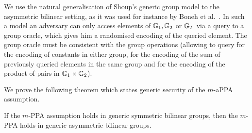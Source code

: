 We use the natural generalisation of Shoup's generic group model \cite{EC:Shoup97} to the asymmetric bilinear setting, as it was used for instance by Boneh et al.~\cite{EC:BonBoyGoh05}. In such a model an adversary can only access elements of $\mathbb{G}_1,\mathbb{G}_2$ or $\mathbb{G}_T$ via a query to a group oracle, which gives him a randomised  encoding of the queried element. The group oracle must be consistent with the group operations (allowing to query for the encoding of constants in either group, for the encoding of the sum of previously queried elements in the same group and for the encoding of the product of pairs in $\mathbb{G}_1\times \mathbb{G}_2$).

We prove the following theorem which states generic security of the $m$-aPPA assumption.

\begin{theorem}
	If the $m$-PPA assumption holds in generic symmetric bilinear groups, then the $m$-PPA holds in generic asymmetric bilinear groups.
\end{theorem}
